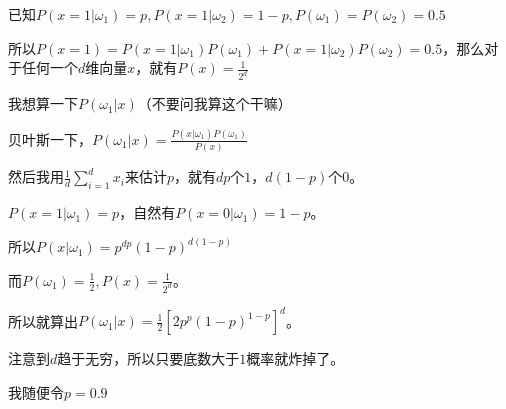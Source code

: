 \documentclass{ctexart}
\begin{document}
已知$P(x=1|\omega_1)=p,P(x=1|\omega_2)=1-p,P(\omega_1)=P(\omega_2)=0.5$

所以$P(x=1)=P(x=1|\omega_1)P(\omega_1)+P(x=1|\omega_2)P(\omega_2)=0.5$，那么对于任何一个$d$维向量$x$，就有$P(x)=\frac{1}{2^d}$

我想算一下$P(\omega_1|x)$（不要问我算这个干嘛）

贝叶斯一下，$P(\omega_1|x)=\frac{P(x|\omega_1)P(\omega_1)}{P(x)}$

然后我用$\frac{1}{d}\sum\limits_{i=1}^d x_i$来估计$p$，就有$dp$个$1$，$d(1-p)$个$0$。

$P(x=1|\omega_1)=p$，自然有$P(x=0|\omega_1)=1-p$。

所以$P(x|\omega_1)=p^{dp}(1-p)^{d(1-p)}$

而$P(\omega_1)=\frac{1}{2},P(x)=\frac{1}{2^d}$。

所以就算出$P(\omega_1|x)=\frac{1}{2}[2p^p(1-p)^{1-p}]^d$。

注意到$d$趋于无穷，所以只要底数大于$1$概率就炸掉了。

我随便令$p=0.9$
\end{document}
